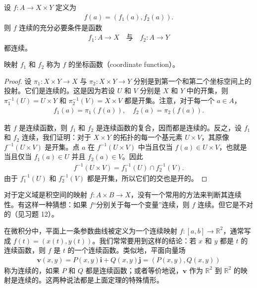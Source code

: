 \documentclass[../../main.tex]{subfiles}
\begin{document}
\begin{theorem}[到积空间的映射]\label{theorem:ch02-积空间映射}
设 $f: A \rightarrow X \times Y$ 定义为
\begin{align*}
f(a) = (f_{1}(a), f_{2}(a)).
\end{align*}
则 $f$ 连续的充分必要条件是函数
\begin{align*}
f_{1}: A \longrightarrow X \quad \text{与} \quad f_{2}: A \longrightarrow Y
\end{align*}
都连续。

映射 $f_{1}$ 和 $f_{2}$ 称为 $f$ 的坐标函数（coordinate function）。
\end{theorem}

\begin{proof}
设 $\pi_{1}: X \times Y \rightarrow X$ 与 $\pi_{2}: X \times Y \rightarrow Y$ 分别是到第一个和第二个坐标空间上的投射。它们是连续的。这是因为若设 $U$ 和 $V$ 分别是 $X$ 和 $Y$ 中的开集，则 $\pi_{1}^{-1}(U) = U \times Y$ 和 $\pi_{2}^{-1}(V) = X \times V$ 都是开集。注意，对于每一个 $a \in A$，
\begin{align*}
f_{1}(a) = \pi_{1}(f(a)), \quad f_{2}(a) = \pi_{2}(f(a)).
\end{align*}

若 $f$ 是连续函数，则 $f_{1}$ 和 $f_{2}$ 是连续函数的复合，因而都是连续的。反之，设 $f_{1}$ 和 $f_{2}$ 连续，我们证明：对于 $X \times Y$ 的拓扑的每一个基元素 $U \times V$，其原像 $f^{-1}(U \times V)$ 是开集。点 $a$ 在 $f^{-1}(U \times V)$ 中当且仅当 $f(a) \in U \times V$，也就是当且仅当 $f_{1}(a) \in U$ 并且 $f_{2}(a) \in V$。因此
\begin{align*}
f^{-1}(U \times V) = f_{1}^{-1}(U) \cap f_{2}^{-1}(V).
\end{align*}
由于 $f_{1}^{-1}(U)$ 和 $f_{2}^{-1}(V)$ 都是开集，所以它们的交也是开的。
\end{proof}

对于定义域是积空间的映射 $f: A \times B \rightarrow X$，没有一个常用的方法来判断其连续性。有这样一种猜想：如果 $f$“分别关于每一个变量”连续，则 $f$ 连续。但它是不对的（见习题 12）。

\begin{example}\label{example:ch02-参数曲线}
在微积分中，平面上一条参数曲线被定义为一个连续映射 $f: [a, b] \rightarrow \mathbb{R}^{2}$，通常写成 $f(t) = (x(t), y(t))$。我们常常要用到这样的结论：若 $x$ 和 $y$ 都是 $t$ 的连续函数，则 $f$ 是 $t$ 的一个连续函数。类似地，平面向量场
\begin{align*}
\bm{v}(x, y) = P(x, y)\bm{i} + Q(x, y)\bm{j} = (P(x, y), Q(x, y))
\end{align*}
称为连续的，如果 $P$ 和 $Q$ 都是连续函数；或者等价地说，$\bm{v}$ 作为 $\mathbb{R}^{2}$ 到 $\mathbb{R}^{2}$ 的映射是连续的。这两种说法都是上面定理的特殊情形。
\end{example}
\end{document}
